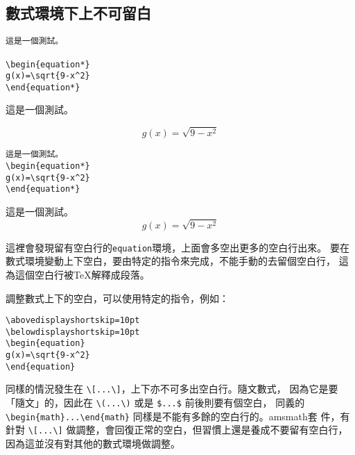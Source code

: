\subsection{數式環境下上不可留白}

\begin{Wrong}
\begin{verbatim}
這是一個測試。

\begin{equation*}
g(x)=\sqrt{9-x^2}
\end{equation*}
\end{verbatim}
這是一個測試。

\begin{equation*}
g(x)=\sqrt{9-x^2}
\end{equation*}
\end{Wrong}

\begin{Right}
\begin{verbatim}
這是一個測試。
\begin{equation*}
g(x)=\sqrt{9-x^2}
\end{equation*}
\end{verbatim}
這是一個測試。
\begin{equation*}
g(x)=\sqrt{9-x^2}
\end{equation*}
\end{Right}

這裡會發現留有空白行的{\tt equation}環境，上面會多空出更多的空白行出來。
要在數式環境變動上下空白，要由特定的指令來完成，不能手動的去留個空白行，
這為這個空白行被\TeX 解釋成段落。

調整數式上下的空白，可以使用特定的指令，例如：

\begin{Code}
\begin{verbatim}
\abovedisplayshortskip=10pt
\belowdisplayshortskip=10pt
\begin{equation}
g(x)=\sqrt{9-x^2}
\end{equation}
\end{verbatim}
\end{Code}

同樣的情況發生在 \verb|\[...\]|，上下亦不可多出空白行。隨文數式，
因為它是要「隨文」的，因此在 \verb|\(...\)| 或是 \verb|$...$| 前後則要有個空白，
同義的 \verb|\begin{math}...\end{math}| 同樣是不能有多餘的空白行的。{\sf amsmath}套
件，有針對 \verb|\[...\]| 做調整，會回復正常的空白，但習慣上還是養成不要留有空白行，
因為這並沒有對其他的數式環境做調整。

\marginpar{\back}
